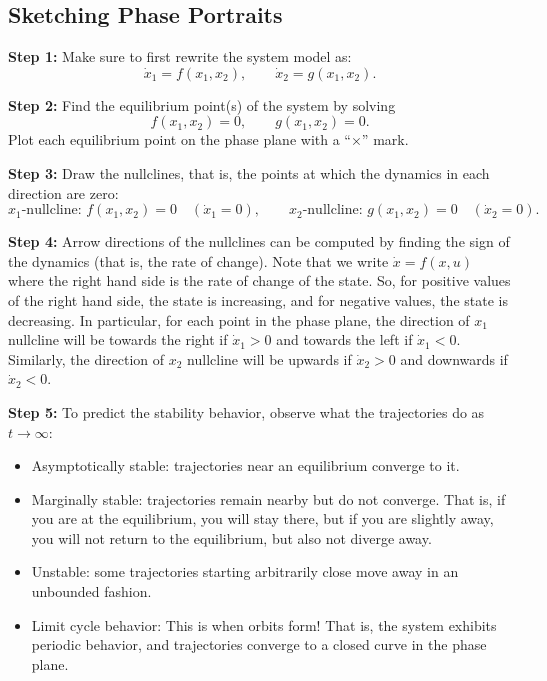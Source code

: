 \documentclass{ee122_notes}
\begin{document}
\noindent\normalsize

\subsection*{Sketching Phase Portraits}\par

\textbf{Step 1:} Make sure to first rewrite the system model as:
\[
\dot x_1=f(x_1,x_2), \qquad \dot x_2=g(x_1,x_2).
\]

\textbf{Step 2:} Find the equilibrium point(s) of the system by solving
\[
f(x_1,x_2)=0,\qquad g(x_1,x_2)=0.
\]
Plot each equilibrium point on the phase plane with a ``$\times$'' mark.


\textbf{Step 3:} Draw the nullclines, that is, the points at which the dynamics in each direction are zero:
\[
\text{\(x_1\)-nullcline: } f(x_1,x_2)=0 \quad (\dot x_1=0),
\qquad
\text{\(x_2\)-nullcline: } g(x_1,x_2)=0 \quad (\dot x_2=0).
\]


\textbf{Step 4:} Arrow directions of the nullclines can be computed by finding the sign of the dynamics (that is, the rate of change). Note that we write $\dot x = f(x, u)$ where the right hand side is the rate of change of the state. So, for positive values of the right hand side, the state is increasing, and for negative values, the state is decreasing. In particular, for each point in the phase plane, the direction of $x_1$ nullcline will be towards the right if $\dot x_1 > 0$ and towards the left if $\dot x_1 < 0$. Similarly, the direction of $x_2$ nullcline will be upwards if $\dot x_2 > 0$ and downwards if $\dot x_2 < 0$. 


\textbf{Step 5:} To predict the stability behavior, observe what the trajectories do as \(t\to\infty\):
\begin{itemize}
\item Asymptotically stable: trajectories near an equilibrium converge to it.
\item Marginally stable: trajectories remain nearby but do not converge. That is, if you are at the equilibrium, you will stay there, but if you are slightly away, you will not return to the equilibrium, but also not diverge away.
\item Unstable: some trajectories starting arbitrarily close move away in an unbounded fashion.
\item Limit cycle behavior: This is when orbits form! That is, the system exhibits periodic behavior, and trajectories converge to a closed curve in the phase plane. 
\end{itemize}
\end{document}
